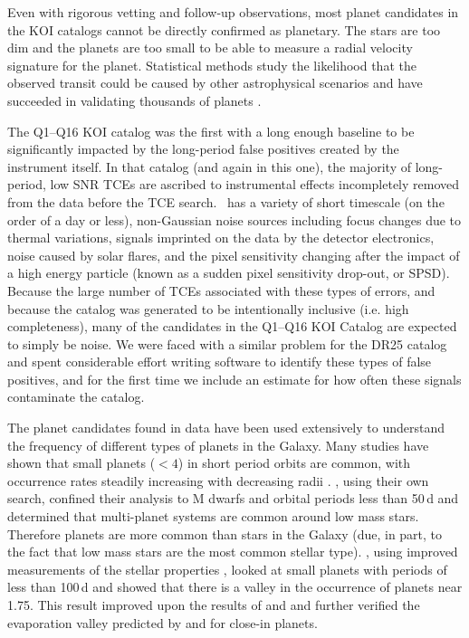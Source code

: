 
Even with rigorous vetting and follow-up observations, most planet candidates in the KOI catalogs cannot be directly confirmed as planetary. The stars are too dim and the planets are too small to be able to measure a radial velocity signature for the planet.   Statistical methods study the likelihood that the observed transit could be caused by other astrophysical scenarios and have succeeded in validating thousands of \Kepler{} planets \citep[e.g.][]{Lissauer2014,Morton2016,Rowe2014,Torres2015}.  

The Q1--Q16 KOI catalog \citep{Mullally2015cat} was the first with a long enough baseline to be significantly impacted by the long-period false positives created by the instrument itself.  In that catalog (and again in this one), the majority of long-period, low SNR TCEs are ascribed to instrumental effects incompletely removed from the data before the TCE search. \Kepler\ has a variety of short timescale (on the order of a day or less), non-Gaussian noise sources including focus changes due to thermal variations, signals imprinted on the data by the detector electronics, noise caused by solar flares, and the pixel sensitivity changing after the impact of a high energy particle (known as a sudden pixel sensitivity drop-out, or SPSD). Because the large number of TCEs associated with these types of errors, and because the catalog was generated to be intentionally inclusive (i.e. high completeness), many of the candidates in the Q1--Q16 KOI Catalog are expected to simply be noise.  We were faced with a similar problem for the DR25 catalog and spent considerable effort writing software to identify these types of false positives, and for the first time we include an estimate for how often these signals contaminate the catalog.

The planet candidates found in \Kepler{} data have been used extensively to understand the frequency of different types of planets in the Galaxy. Many studies have shown that small planets ($<4$\re) in short period orbits are common, with occurrence rates steadily increasing with decreasing radii \citep{Burke2016,Howard2012,Petigura2013b,Youdin2011}.  \citet{Dressing2013,Dressing2015}, using their own search, confined their analysis to M dwarfs and orbital periods less than 50\,d and determined that multi-planet systems are common around low mass stars.  Therefore planets are more common than stars in the Galaxy (due, in part, to the fact that low mass stars are the most common stellar type). 
\citet{Fulton2017}, using improved measurements of the stellar properties \citep{Petigura2017}, looked at small planets with periods of less than 100\,d and showed that there is a valley in the occurrence of planets near 1.75\re{}. This result improved upon the results of \citet{Howard2012} and \citet{Lundkvist2016} and further verified the evaporation valley predicted by \citet{Owen2013} and \citet{Lopez2013} for close-in planets.


